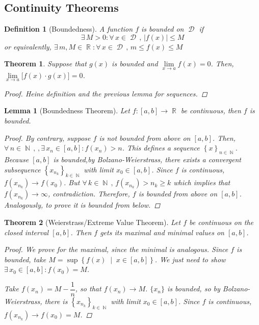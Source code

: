 \documentclass[12pt]{article}
\newcommand{\set}[2]{\left\{{#1}\;\middle|\;{#2}\right\}}
\newcommand{\Forall}[1]{\forall\,{#1}\,,\,}
\newcommand{\Exist}[1]{\exists\,{#1}:}
\newcommand{\seq}[2]{\left\{{#1}\right\}_{#2 \in\N}}
\DeclareMathOperator{\N}{\mathbb{N}}
\DeclareMathOperator{\R}{\mathbb{R}}
\DeclareMathOperator{\D}{\mathcal{D}}
\newtheorem{theorem}{Theorem}[subsection]
\newtheorem{definition}{Definition}[subsection]
\newtheorem{lemma}{Lemma}[subsection]
\begin{document}
\subsection{Continuity Theorems}

\begin{definition}[Boundedness]
  A function $f$ is bounded on $\D$ if
  $$\Exist{M>0}\Forall{x\in\D} |f(x)|\leq M$$
  or equivalently, $\Exist{m,M\in\R}\Forall{x\in\D} m\leq f(x)\leq M$
\end{definition}

\begin{theorem}
  Suppose that $g(x)$ is bounded and $\lim\limits_{x\to a}f(x)=0$. Then, $\lim\limits_{x\to a}\big[f(x)\cdot g(x)\big]=0$.
  \begin{proof}
    Heine definition and the previous lemma for sequences.
  \end{proof}
\end{theorem}

\begin{lemma}[Boundedness Theorem]
  Let $f:[a,b]\to\R$ be continuous, then $f$ is bounded.
  \begin{proof}
    By contrary, suppose $f$ is not bounded from above on $[a,b]$. Then, $\Forall{n\in\N},\Exist{x_n\in[a,b]}f(x_n)>n$. This defines a sequence $\seq{x}{n}$. Because $[a,b]$ is bounded,by Bolzano-Weierstrass, there exists a convergent subsequence $\seq{x_{n_k}}{k}$ with limit $x_0\in[a,b]$. Since $f$ is continuous, $f(x_{n_k})\to f(x_0)$. But $\Forall{k\in\N}f(x_{n_k})>n_{k}\geq k$ which implies that $f(x_{n_k})\to \infty$, contradiction. Therefore, $f$ is bounded from above on $[a,b]$. Analogously, to prove it is bounded from below.
  \end{proof}
\end{lemma}

\begin{theorem}[Weierstrass/Extreme Value Theorem]
  Let $f$ be continuous on the closed interval $[a,b]$. Then $f$ gets its maximal and minimal values on $[a,b]$.
  \begin{proof}
    We prove for the maximal, since the minimal is analogous. Since $f$ is bounded, take $M=\sup\set{f(x)}{x\in[a,b]}$. We just need to show $\Exist{x_0\in[a,b]}f(x_0)=M$. 
    
    Take $f(x_n)=M-\dfrac{1}{n}$, so that $f(x_n)\to M$. $\{x_n\}$ is bounded, so by Bolzano-Weierstrass, there is $\seq{x_{n_k}}{k}$ with limit $x_0\in[a,b]$. Since $f$ is continuous, $f(x_{n_k})\to f(x_0)=M$.
  \end{proof}
\end{theorem}
\end{document}
